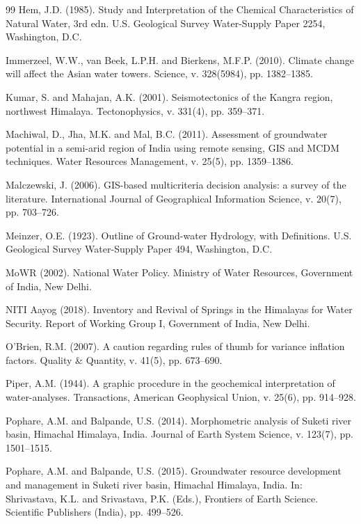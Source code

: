 \documentclass[10pt,a4paper,twocolumn]{article}
\begin{document}
\begin{thebibliography}{99}
Hem, J.D. (1985). Study and Interpretation of the Chemical Characteristics of Natural Water,
3rd edn. U.S. Geological Survey Water-Supply Paper 2254, Washington, D.C.

Immerzeel, W.W., van Beek, L.P.H. and Bierkens, M.F.P. (2010). Climate change will affect the
Asian water towers. Science, v. 328(5984), pp. 1382--1385.

Kumar, S. and Mahajan, A.K. (2001). Seismotectonics of the Kangra region, northwest Himalaya.
Tectonophysics, v. 331(4), pp. 359--371.

Machiwal, D., Jha, M.K. and Mal, B.C. (2011). Assessment of groundwater potential in a
semi-arid region of India using remote sensing, GIS and MCDM techniques. Water Resources
Management, v. 25(5), pp. 1359--1386.

Malczewski, J. (2006). GIS-based multicriteria decision analysis: a survey of the literature.
International Journal of Geographical Information Science, v. 20(7), pp. 703--726.

Meinzer, O.E. (1923). Outline of Ground-water Hydrology, with Definitions. U.S. Geological
Survey Water-Supply Paper 494, Washington, D.C.

MoWR (2002). National Water Policy. Ministry of Water Resources, Government of India, New Delhi.

NITI Aayog (2018). Inventory and Revival of Springs in the Himalayas for Water Security. Report
of Working Group I, Government of India, New Delhi.

O'Brien, R.M. (2007). A caution regarding rules of thumb for variance inflation factors.
Quality \& Quantity, v. 41(5), pp. 673--690.

Piper, A.M. (1944). A graphic procedure in the geochemical interpretation of water-analyses.
Transactions, American Geophysical Union, v. 25(6), pp. 914--928.

Pophare, A.M. and Balpande, U.S. (2014). Morphometric analysis of Suketi river basin, Himachal
Himalaya, India. Journal of Earth System Science, v. 123(7), pp. 1501--1515.

Pophare, A.M. and Balpande, U.S. (2015). Groundwater resource development and management in
Suketi river basin, Himachal Himalaya, India. In: Shrivastava, K.L. and Srivastava, P.K. (Eds.),
Frontiers of Earth Science. Scientific Publishers (India), pp. 499--526.


\end{thebibliography}
\end{document}
